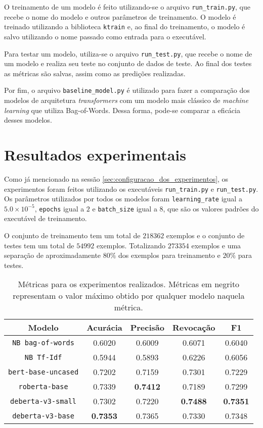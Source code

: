 O treinamento de um modelo é feito utilizando-se o arquivo
\texttt{run\_train.py}, que recebe o nome do modelo e outros parâmetros de
treinamento. O modelo é treinado utilizando a biblioteca \texttt{ktrain} e, ao
final do treinamento, o modelo é salvo utilizando o nome passado como entrada
para o executável.

Para testar um modelo, utiliza-se o arquivo \texttt{run\_test.py}, que recebe o
nome de um modelo e realiza seu teste no conjunto de dados de teste. Ao final
dos testes as métricas são salvas, assim como as predições realizadas.

Por fim, o arquivo \texttt{baseline\_model.py} é utilizado para fazer a
comparação dos modelos de arquitetura \textit{transformers} com um modelo mais
clássico de \textit{machine learning} que utiliza Bag-of-Words. Dessa forma,
pode-se comparar a eficácia desses modelos.

\section{Resultados experimentais}%
\label{sec:resultados_experimentais}

Como já mencionado na sessão \ref{sec:configuracao_dos_experimentos}, os
experimentos foram feitos utilizando os executáveis \texttt{run\_train.py} e
\texttt{run\_test.py}. Os parâmetros utilizados por todos os modelos foram
\texttt{learning\_rate} igual a $5.0\times 10^{-5}$, \texttt{epochs} igual a
$2$ e \texttt{batch\_size} igual a $8$, que são os valores padrões do executável
de treinamento.

O conjunto de treinamento tem um total de $218362$ exemplos e o conjunto de
testes tem um total de $54992$ exemplos. Totalizando $273354$ exemplos e uma
separação de aproximadamente $80\%$ dos exemplos para treinamento e $20\%$ para
testes.

\begin{table}[h]
\centering
\caption{Métricas para os experimentos realizados. Métricas em negrito
   representam o valor máximo obtido por qualquer modelo naquela métrica.}
\label{tab:experiments}
\begin{tabular}{c | c c c c}
   \textbf{Modelo} & \textbf{Acurácia} & \textbf{Precisão} & \textbf{Revocação}
                  & \textbf{F1} \\ \hline \hline
   \texttt{NB bag-of-words} & 0.6020 & 0.6009 & 0.6071 & 0.6040 \\
   \texttt{NB Tf-Idf} & 0.5944 & 0.5893 & 0.6226 & 0.6056 \\ \hline
   \texttt{bert-base-uncased} & 0.7202 & 0.7159 & 0.7301 & 0.7229 \\
   \texttt{roberta-base} & 0.7339 & \textbf{0.7412} & 0.7189 & 0.7299 \\
   \texttt{deberta-v3-small} & 0.7302 & 0.7220 & \textbf{0.7488} & \textbf{0.7351} \\
   \texttt{deberta-v3-base} & \textbf{0.7353} & 0.7365 & 0.7330 & 0.7348 \\ \hline
\end{tabular}
\end{table}

